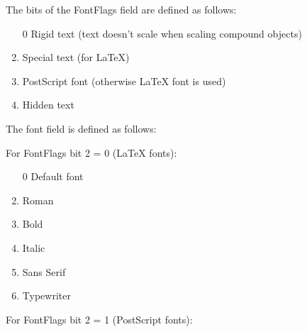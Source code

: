 \documentclass[10pt, a4paper]{article}
\begin{document}
The bits of the FontFlags field are defined as follows:

\begin{enumerate}
\item[0]
Rigid text (text doesn't scale when scaling compound objects)
\item
Special text (for \LaTeX)
\item
PostScript font (otherwise \LaTeX{} font is used)
\item
Hidden text
\end{enumerate}

The font field is defined as follows:

For FontFlags bit 2 = 0 (\LaTeX{} fonts):

\begin{enumerate}
\item[0] Default font
\item    Roman
\item    Bold
\item    Italic
\item    Sans Serif
\item    Typewriter
\end{enumerate}

For FontFlags bit 2 = 1 (PostScript fonts):
\end{document}
